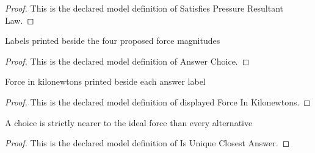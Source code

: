 \begin{proof}
  This is the declared model definition of Satisfies Pressure Resultant Law.
\end{proof}
\begin{definition}
  \label{def:physics:phyx-mini-0392:phyxminiproblems-problemphyxmini0392-answerchoice}
  Labels printed beside the four proposed force magnitudes
\end{definition}
\begin{proof}
  This is the declared model definition of Answer Choice.
\end{proof}
\begin{definition}
  \label{def:physics:phyx-mini-0392:phyxminiproblems-problemphyxmini0392-displayedforceinkilonewtons}
  Force in kilonewtons printed beside each answer label
\end{definition}
\begin{proof}
  This is the declared model definition of displayed Force In Kilonewtons.
\end{proof}
\begin{definition}
  \label{def:physics:phyx-mini-0392:phyxminiproblems-problemphyxmini0392-isuniqueclosestanswer}
  A choice is strictly nearer to the ideal force than every alternative
\end{definition}
\begin{proof}
  This is the declared model definition of Is Unique Closest Answer.
\end{proof}
